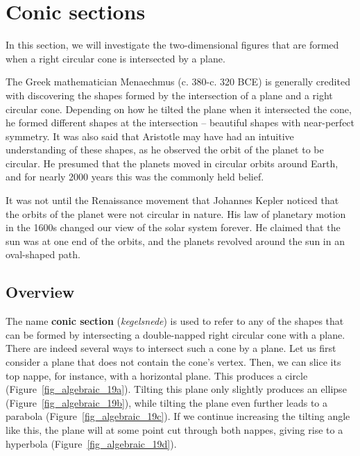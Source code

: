 \fi


\pagebreak
\section{Conic sections}
\label{sec_conic}
In this section, we will investigate the two-dimensional figures that are formed when a right circular cone is intersected by a plane.

\ifcourse
\begin{remark}
The Greek mathematician Menaechmus (c. 380-c. 320 BCE) is generally credited with discovering the shapes formed by the intersection of a plane and a right circular cone. Depending on how he tilted the plane when it intersected the cone, he formed different shapes at the intersection -- beautiful shapes with near-perfect symmetry. It was also said that Aristotle may have had an intuitive understanding of these shapes, as he observed the orbit of the planet to be circular. He presumed that the planets moved in circular orbits around Earth, and for nearly 2000 years this was the commonly held belief.

It was not until the Renaissance movement that Johannes Kepler noticed that the orbits of the planet were not circular in nature. His law of planetary motion in the 1600s changed our view of the solar system forever. He claimed that the sun was at one end of the orbits, and the planets revolved around the sun in an oval-shaped path.
\end{remark}
\fi


\subsection{Overview}

The name \textbf{conic section} (\textit{kegelsnede}) is used to refer to any of the shapes that can be formed by intersecting a double-napped right circular cone with a plane. There are indeed several ways to intersect such a cone by a plane. Let us first consider a plane that does not contain the cone's vertex. Then, we can slice its top nappe, for instance, with a horizontal plane. This produces a circle (Figure~\ref{fig_algebraic_19a}). Tilting this plane only slightly produces an ellipse (Figure~\ref{fig_algebraic_19b}), while tilting the plane even further leads to a parabola (Figure~\ref{fig_algebraic_19c}). If we continue increasing the tilting angle like this, the plane will at some point cut through both nappes, giving rise to a hyperbola (Figure~\ref{fig_algebraic_19d}). 


